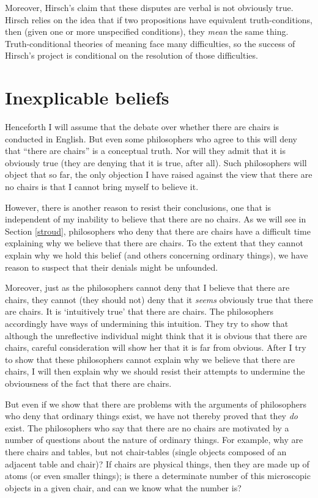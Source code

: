\documentclass[11pt]{article}
\begin{document}
\begin{spacing}{1.25}
Moreover, Hirsch's claim that these disputes are verbal is not
obviously true.  Hirsch relies on the idea that if two propositions
have equivalent truth-conditions, then (given one or more unspecified
conditions), they {\em mean} the same thing.  Truth-conditional
theories of meaning face many difficulties, so the success of Hirsch's
project is conditional on the resolution of those difficulties.

\section{Inexplicable beliefs}
Henceforth I will assume that the debate over whether there are chairs
is conducted in English.  But even some philosophers who agree to this
will deny that ``there are chairs'' is a conceptual truth.  Nor will
they admit that it is obviously true (they are denying that it is
true, after all).  Such philosophers will object that so far, the only
objection I have raised against the view that there are no chairs is
that I cannot bring myself to believe it.

However, there is another reason to resist their conclusions, one that
is independent of my inability to believe that there are no chairs.
As we will see in Section \ref{stroud}, philosophers who deny that
there are chairs have a difficult time explaining why we believe that
there are chairs.  To the extent that they cannot explain why we hold
this belief (and others concerning ordinary things), we have reason to
suspect that their denials might be unfounded.

Moreover, just as the philosophers cannot deny that I believe that
there are chairs, they cannot (they should not) deny that it {\em
  seems} obviously true that there are chairs.  It is `intuitively
true' that there are chairs.  The philosophers accordingly have ways
of undermining this intuition.  They try to show that although the
unreflective individual might think that it is obvious that there are
chairs, careful consideration will show her that it is far from
obvious.  After I try to show that these philosophers cannot explain
why we believe that there are chairs, I will then explain why we
should resist their attempts to undermine the obviousness of the fact
that there are chairs.

But even if we show that there are problems with the arguments of
philosophers who deny that ordinary things exist, we have not thereby
proved that they {\em do} exist.  The philosophers who say that there
are no chairs are motivated by a number of questions about the nature
of ordinary things.  For example, why are there chairs and tables, but
not chair-tables (single objects composed of an adjacent table and
chair)?  If chairs are physical things, then they are made up of atoms
(or even smaller things); is there a determinate number of this
microscopic objects in a given chair, and can we know what the number
is?


\end{spacing}
\end{document}
